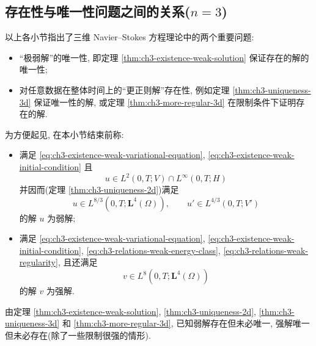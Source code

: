 \hypertarget{chapter-03-page-224}{}
\subsection{存在性与唯一性问题之间的关系($n=3$)}
\label{subsec:ch3-existence-uniqueness-relations}
以上各小节指出了三维 Navier--Stokes 方程理论中的两个重要问题:

\begin{itemize}
\item “极弱解”的唯一性, 即定理 \ref{thm:ch3-existence-weak-solution} 保证存在的解的唯一性;
\item 对任意数据在整体时间上的“更正则解”存在性, 例如定理 \ref{thm:ch3-uniqueness-3d} 保证唯一性的解, 或定理 \ref{thm:ch3-more-regular-3d} 在限制条件下证明存在的解.
\end{itemize}

为方便起见, 在本小节结束前称:

\begin{itemize}
\item 满足 \eqref{eq:ch3-existence-weak-variational-equation}, \eqref{eq:ch3-existence-weak-initial-condition} 且
\begin{equation}
u\in L^2(0,T;V)\cap L^\infty(0,T;H)
\label{eq:ch3-relations-weak-energy-class}
\end{equation}
并因而(定理 \ref{thm:ch3-uniqueness-2d})满足
\begin{equation}
u\in L^{8/3}(0,T;\mathbf L^4(\Omega)),
\qquad u'\in L^{4/3}(0,T;V')
\label{eq:ch3-relations-weak-regularity}
\end{equation}
的解 $u$ 为弱解;
\item 满足 \eqref{eq:ch3-existence-weak-variational-equation}, \eqref{eq:ch3-existence-weak-initial-condition}, \eqref{eq:ch3-relations-weak-energy-class}, \eqref{eq:ch3-relations-weak-regularity}, 且还满足
\begin{equation}
v\in L^8(0,T;\mathbf L^4(\Omega))
\label{eq:ch3-relations-strong-class}
\end{equation}
的解 $v$ 为强解.
\end{itemize}

由定理 \ref{thm:ch3-existence-weak-solution}, \ref{thm:ch3-uniqueness-2d}, \ref{thm:ch3-uniqueness-3d} 和 \ref{thm:ch3-more-regular-3d}, 已知弱解存在但未必唯一, 强解唯一但未必存在(除了一些限制很强的情形).

